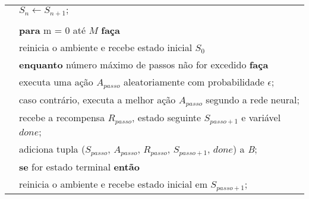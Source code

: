 \begin{tabular}{l l}
 & \qquad \qquad $S_{n} \leftarrow S_{n+1};$ \\
\\
 & \textbf{para} m = 0 até $M$ \textbf{faça}\\
 & \qquad reinicia o ambiente e recebe estado inicial $S_{0}$\\
 & \qquad \textbf{enquanto} número máximo de passos não for excedido \textbf{faça}\\
 & \qquad \qquad executa uma ação $A_{passo}$ aleatoriamente com probabilidade $\epsilon$;\\
 & \qquad \qquad caso contrário, executa a melhor ação $A_{passo}$ segundo a rede neural;\\
 & \qquad \qquad recebe a recompensa $R_{passo}$, estado seguinte $S_{passo+1}$ e variável $done$;\\
 & \qquad \qquad adiciona tupla ($S_{passo}$, $A_{passo}$, $R_{passo}$, $S_{passo+1}$, $done$) a \textit{B};\\
 & \qquad \qquad \textbf{se} for estado terminal \textbf{então}\\
 & \qquad \qquad \qquad reinicia o ambiente e recebe estado inicial em $S_{passo+1}$;\\

\end{tabular}
